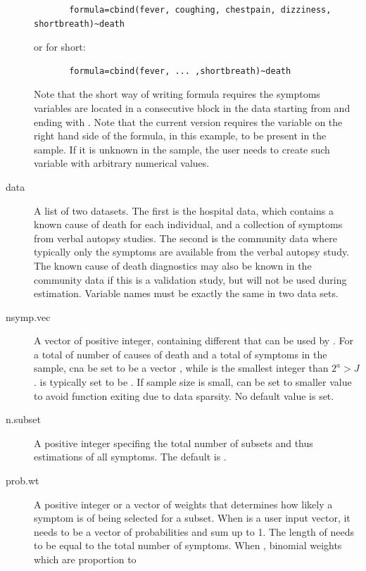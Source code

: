 \documentclass[oneside,letterpaper,titlepage]{article}
\begin{document}
\begin{description}
    \begin{verbatim}
       formula=cbind(fever, coughing, chestpain, dizziness, shortbreath)~death
    \end{verbatim}
  or for short:
    \begin{verbatim}
       formula=cbind(fever, ... ,shortbreath)~death
       \end{verbatim}
  Note that the short way of writing formula requires the symptoms
  variables are located in a consecutive block in the data starting
  from  and ending with .
Note that the current version requires the variable on the right hand
   side of the formula,  in this example, to be present in
   the  sample. If it is unknown in the
    sample, the user needs to create such variable
   with arbitrary numerical values.
\item[data] A list of two datasets. The first is the hospital data,
  which contains a known cause of death for each individual, and a
  collection of symptoms from verbal autopsy studies.  The second is
  the community data where typically only the symptoms are available
  from the verbal autopsy study. The known cause of death diagnostics
  may also be known in the community data if this is a validation
  study, but will not be used during estimation.  Variable names must
  be exactly the same in two data sets.
\item[nsymp.vec] A vector of positive integer, containing different
   that can be used by .  For a total of
   number of causes of death and a total of  symptoms
  in the sample,  cna be set to be a vector
  , while  is the smallest integer than $2^a>J$.
   is typically set to be . If sample
  size is small,  can be set to smaller value to avoid
  function exiting due to data sparsity.  No default value is set.
  \item[n.subset] A positive integer specifing the total number of
     subsets and thus estimations of all symptoms.
     The default is .
   \item[prob.wt] A positive integer or a vector of weights that determines how
     likely a symptom is of being selected for a subset. When
      is a user input vector, it needs to be a vector 
     of probabilities and sum up to 1. The length of
     \code{[prob.wt} needs to be equal to the total number of symptoms.
     When , binomial weights which are proportion to 

\end{description}
\end{document}

